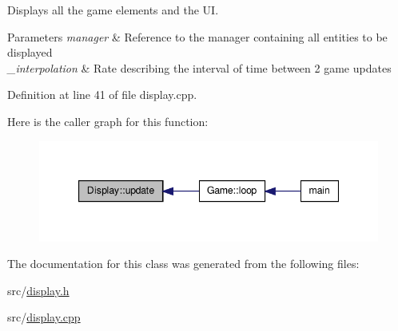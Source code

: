 Displays all the game elements and the U\-I. 


\begin{DoxyParams}{Parameters}
{\em manager} & Reference to the manager containing all entities to be displayed \\
\hline
{\em \-\_\-interpolation} & Rate describing the interval of time between 2 game updates \\
\hline
\end{DoxyParams}


Definition at line 41 of file display.\-cpp.



Here is the caller graph for this function\-:
\nopagebreak
\begin{figure}[H]
\begin{center}
\leavevmode
\includegraphics[width=344pt]{class_display_a713ee81045f32895c2b063037c81c388_icgraph}
\end{center}
\end{figure}




The documentation for this class was generated from the following files\-:\begin{DoxyCompactItemize}
\item 
src/\hyperlink{display_8h}{display.\-h}\item 
src/\hyperlink{display_8cpp}{display.\-cpp}\end{DoxyCompactItemize}
